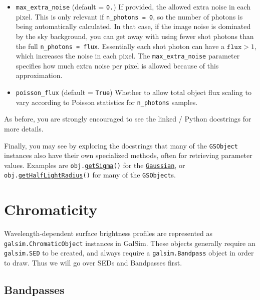 \documentclass[preprint,11pt]{../../devel/modules/aastex}
\begin{document}
\begin{itemize}
{\begin{itemize}
\item \texttt{max\_extra\_noise} (default = \texttt{0.}) \newline If
  provided, the allowed extra noise in each pixel.  This is only
  relevant if \texttt{n\_photons = 0}, so the number of photons is
  being automatically calculated.  In that case, if the image noise is
  dominated by the sky background, you can get away with using fewer
  shot photons than the full \texttt{n\_photons = flux}.  Essentially
  each shot photon can have a $\texttt{flux} > 1$, which increases the
  noise in each pixel.  The \texttt{max\_extra\_noise} parameter
  specifies how much extra noise per pixel is allowed because of this
  approximation.
\item \texttt{poisson\_flux} (default = \texttt{True}) \newline
  Whether to allow total object flux scaling to vary according to
  Poisson statistics for \texttt{n\_photons} samples.
\end{itemize}
As before, you are strongly encouraged to see the linked / Python
docstrings for more details.
}
\end{itemize}

Finally, you may see by exploring the docstrings that many of the \texttt{GSObject}
instances also have their own specialized methods, often for
retrieving parameter values. Examples are
  \texttt{obj.}\href{http://galsim-developers.github.com/GalSim/classgalsim_1_1base_1_1_gaussian.html#a418f2826a7b8934cfedc181de23ce826}{\texttt{getSigma}}\texttt{()}
for the
\href{http://galsim-developers.github.com/GalSim/classgalsim_1_1base_1_1_gaussian.html}{\texttt{Gaussian}},
or
  \texttt{obj.}\href{http://galsim-developers.github.com/GalSim/classgalsim_1_1base_1_1_sersic.html#ad6ca39293c6b478fc052d07ea51d086f}{\texttt{getHalfLightRadius}}\texttt{()}
for many of the \texttt{GSObject}s.

\section{Chromaticity}\label{sect:chromaticity}

Wavelength-dependent surface brightness profiles are represented as
\texttt{galsim.ChromaticObject} instances in GalSim.
These objects generally require an \texttt{galsim.SED} to be created,
and always require a \texttt{galsim.Bandpass} object in order to draw.
Thus we will go over SEDs and Bandpasses first.

\subsection{Bandpasses}
\end{document}
